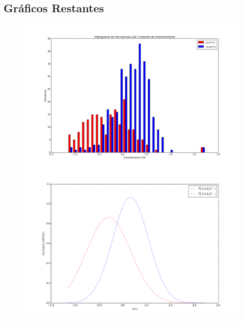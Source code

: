 \documentclass[letter, titlepage, 10pt]{article}
\begin{document}
\newpage
\begin{appendices}
  \renewcommand\thetable{\thesection\arabic{table}}
  \renewcommand\thefigure{\thesection\arabic{figure}}

  \section{Gráficos Restantes} \label{appendix:GraficosRestantes}

  \begin{figure}[H]
  \centering
    \begin{minipage}{.5\textwidth}
        \centering
        \includegraphics[width=1\linewidth]{images/Histograma_D3}
    \end{minipage}%
    \begin{minipage}{.5\textwidth}
        \centering
        \includegraphics[width=1\linewidth]{images/PDF_D3}
    \end{minipage}
\end{figure}


\end{appendices}
\end{document}
